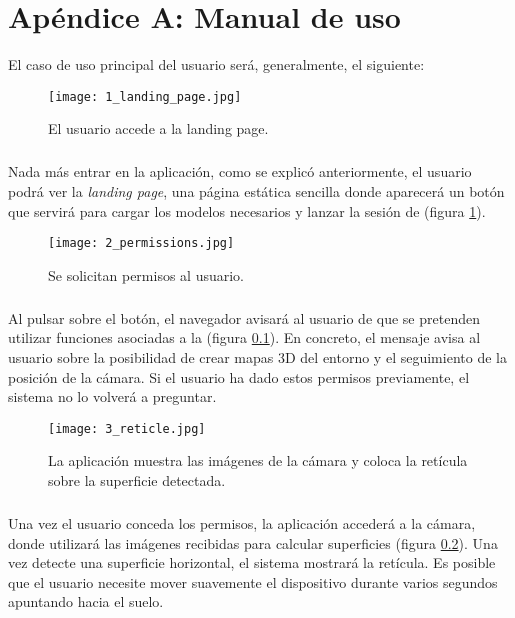\documentclass{subfiles}
\begin{document}
  \chapter*{Apéndice A: Manual de uso}
  \label{sec:anexo_manual_de_uso}

        El caso de uso principal del usuario será, generalmente, el siguiente:

\begin{figure}[H]
\centering
\texttt{[image: 1\_landing\_page.jpg]}
\caption{El usuario accede a la landing page.}
\label{fig:1_landing_page}
\end{figure}

        \paragraph{}
        Nada más entrar en la aplicación, como se explicó anteriormente, el usuario podrá ver la \textit{landing page}, una página estática sencilla donde aparecerá un botón que servirá para cargar los modelos necesarios y lanzar la sesión de \ra (figura \ref{fig:1_landing_page}). 

\begin{figure}[H]
\centering
\texttt{[image: 2\_permissions.jpg]}
\caption{Se solicitan permisos al usuario.}
\label{fig:2_permissions}
\end{figure}

        \paragraph{}
        Al pulsar sobre el botón, el navegador avisará al usuario de que se pretenden utilizar funciones asociadas a la \ra (figura \ref{fig:2_permissions}). En concreto, el mensaje avisa al usuario sobre la posibilidad de crear mapas 3D del entorno y el seguimiento de la posición de la cámara. Si el usuario ha dado estos permisos previamente, el sistema no lo volverá a preguntar.

\begin{figure}[H]
\centering
\texttt{[image: 3\_reticle.jpg]}
\caption{La aplicación muestra las imágenes de la cámara y coloca la retícula sobre la superficie detectada.}
\label{fig:3_reticle}
\end{figure}

        \paragraph{}
        Una vez el usuario conceda los permisos, la aplicación accederá a la cámara, donde utilizará las imágenes recibidas para calcular superficies (figura \ref{fig:3_reticle}). Una vez detecte una superficie horizontal, el sistema mostrará la retícula. Es posible que el usuario necesite mover suavemente el dispositivo durante varios segundos apuntando hacia el suelo.
\end{document}
